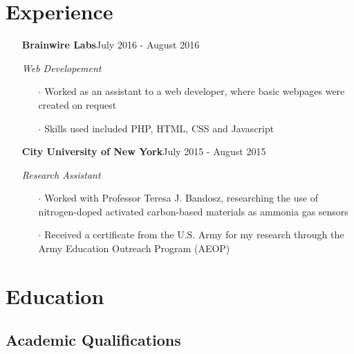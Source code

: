 \documentclass[11pt,letterpaper]{moderncv}
\begin{document}
\makecvtitle
\vspace{-36pt}
\section{Experience}


\begin{itemize}

	\item[]{\textbf{Brainwire Labs}\hfill {July 2016 - August 2016}}
	\vspace{-10pt}
	\item[]{\textit{Web Developement}}
	\vspace{-8pt}
	\begin{itemize}
		\item[$\cdot$]{Worked as an assistant to a web developer, where basic webpages were created on request}
		\vspace{-4pt}
		\item[$\cdot$]{Skills used included PHP, HTML, CSS and Javascript}
	\end{itemize}
	\vspace{-10pt}
	\item[]{\textbf{City University of New York}\hfill {July 2015 - August 2015}}
	\vspace{-10pt}
	\item[]{\textit{Research Assistant} }
	\vspace{-8pt}
	\begin{itemize}
		\item[$\cdot$]{Worked with Professor Teresa J. Bandosz, researching the use of nitrogen-doped activated carbon-based materials as ammonia gas sensors}
		\vspace{-4pt}
		\item[$\cdot$]{Received a certificate from the U.S. Army for my research through the Army Education Outreach Program (AEOP)}
	\end{itemize}

\end{itemize}
\vspace{-16pt}
\section{Education}
\subsection{Academic Qualifications}
\end{document}
